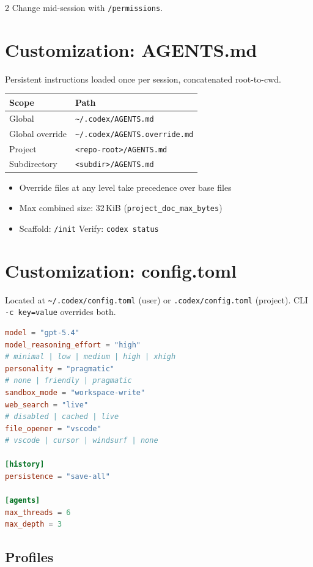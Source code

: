 \documentclass[a4paper, 9pt]{scrartcl}
\makeatletter
\newcommand{\cmdtable}[1]{%
  \smallskip
  \begin{tabularx}{\columnwidth}{@{}lX@{}}
  \toprule
  #1
  \bottomrule
  \end{tabularx}
  \smallskip
}
\makeatother
\begin{document}
\begin{multicols}{2}
Change mid-session with \texttt{/permissions}.

\section{Customization: AGENTS.md}

Persistent instructions loaded once per session, concatenated root-to-cwd.

\cmdtable{
\textbf{Scope} & \textbf{Path} \\
\midrule
Global & \texttt{\textasciitilde/.codex/AGENTS.md} \\
\midrule
Global override & \texttt{\textasciitilde/.codex/AGENTS.override.md} \\
\midrule
Project & \texttt{<repo-root>/AGENTS.md} \\
\midrule
Subdirectory & \texttt{<subdir>/AGENTS.md} \\
}

\begin{itemize}
\item Override files at any level take precedence over base files
\item Max combined size: 32\,KiB (\texttt{project\_doc\_max\_bytes})
\item Scaffold: \texttt{/init} \quad Verify: \texttt{codex status}
\end{itemize}

\section{Customization: config.toml}

Located at \texttt{\textasciitilde/.codex/config.toml} (user) or \texttt{.codex/config.toml} (project). CLI \texttt{-c key=value} overrides both.

\begin{lstlisting}[language=toml]
model = "gpt-5.4"
model_reasoning_effort = "high"
# minimal | low | medium | high | xhigh
personality = "pragmatic"
# none | friendly | pragmatic
sandbox_mode = "workspace-write"
web_search = "live"
# disabled | cached | live
file_opener = "vscode"
# vscode | cursor | windsurf | none

[history]
persistence = "save-all"

[agents]
max_threads = 6
max_depth = 3
\end{lstlisting}

\subsection{Profiles}


\end{multicols}
\end{document}
